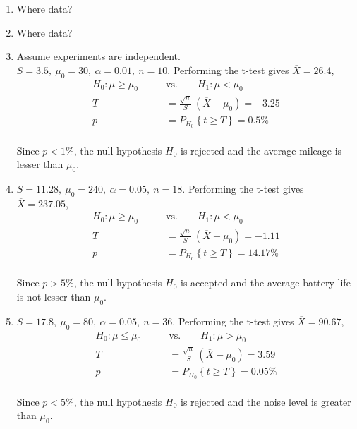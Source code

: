 \begin{enumerate}
	
	\item Where data? \\
	
	\item Where data? \\
	
	\item Assume experiments are independent.\\
		$ S = 3.5,\ \mu_0 = 30,\ \alpha = 0.01,\ n = 10$. Performing the t-test gives $ \overline{X} = 26.4 $,\\
		\begin{align}
			H_0 : \mu \geq \mu_0 \qquad &\text{vs.} \qquad H_1 : \mu < \mu_0 \nonumber \\
			T &= \frac{\sqrt{n}}{S}\ (\overline{X} - \mu_0) = -3.25 \nonumber \\
			p &= P_{H_0}\left\{t \geq T\right\} = 0.5\% 
		\end{align}\\
		Since $ p < 1\% $, the null hypothesis $ H_0 $ is rejected and the average mileage is lesser than $ \mu_0 $.\\
		
	\item $ S = 11.28,\ \mu_0 = 240,\ \alpha = 0.05,\ n = 18$. Performing the t-test gives $ \overline{X} = 237.05 $,\\
	\begin{align}
		H_0 : \mu \geq \mu_0 \qquad &\text{vs.} \qquad H_1 : \mu < \mu_0 \nonumber \\
		T &= \frac{\sqrt{n}}{S}\ (\overline{X} - \mu_0) = -1.11 \nonumber \\
		p &= P_{H_0}\left\{t \geq T\right\} = 14.17\% 
	\end{align}\\
	Since $ p > 5\% $, the null hypothesis $ H_0 $ is accepted and the average battery life is not lesser than $ \mu_0 $.\\
	
	\item $ S = 17.8,\ \mu_0 = 80,\ \alpha = 0.05,\ n = 36$. Performing the t-test gives $ \overline{X} = 90.67 $,\\
	\begin{align}
		H_0 : \mu \leq \mu_0 \qquad &\text{vs.} \qquad H_1 : \mu > \mu_0 \nonumber \\
		T &= \frac{\sqrt{n}}{S}\ (\overline{X} - \mu_0) = 3.59 \nonumber \\
		p &= P_{H_0}\left\{t \geq T\right\} = 0.05\% 
	\end{align}\\
	Since $ p < 5\% $, the null hypothesis $ H_0 $ is rejected and the noise level is greater than $ \mu_0 $.\\
	

\end{enumerate}
